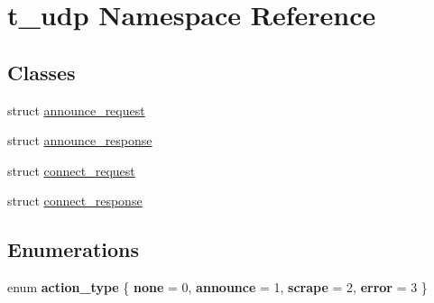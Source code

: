 \hypertarget{namespacet__udp}{}\section{t\+\_\+udp Namespace Reference}
\label{namespacet__udp}
\subsection*{Classes}
\begin{DoxyCompactItemize}
\item 
struct \hyperlink{structt__udp_1_1announce__request}{announce\+\_\+request}
\item 
struct \hyperlink{structt__udp_1_1announce__response}{announce\+\_\+response}
\item 
struct \hyperlink{structt__udp_1_1connect__request}{connect\+\_\+request}
\item 
struct \hyperlink{structt__udp_1_1connect__response}{connect\+\_\+response}
\end{DoxyCompactItemize}
\subsection*{Enumerations}
\begin{DoxyCompactItemize}
\item 
\mbox{\label{namespacet__udp_a6196aec9debc020a36ee358692339614}} 
enum {\bfseries action\+\_\+type} \{ {\bfseries none} = 0, 
{\bfseries announce} = 1, 
{\bfseries scrape} = 2, 
{\bfseries error} = 3
 \}
\end{DoxyCompactItemize}
